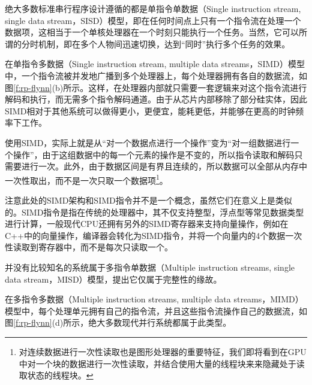 绝大多数标准串行程序设计遵循的都是单指令单数据（Single instruction stream, single data stream，SISD）模型，即在任何时间点上只有一个指令流在处理一个数据项，这相当于一个单核处理器在一个时刻只能执行一个任务。当然，它可以所谓的分时机制，即在多个人物间迅速切换，达到“同时”执行多个任务的效果。

在单指令多数据（Single instruction stream, multiple data streams，SIMD）模型中，一个指令流被并发地广播到多个处理器上，每个处理器拥有各自的数据流，如图\ref{f:rp-flynn}(b)所示。这样，在处理器内部就只需要一套逻辑来对这个指令流进行解码和执行，而无需多个指令解码通道。由于从芯片内部移除了部分硅实体，因此SIMD相对于其他系统可以做得更小，更便宜，能耗更低，并能够在更高的时钟频率下工作。

使用SIMD，实际上就是从“对一个数据点进行一个操作”变为“对一组数据进行一个操作”，由于这组数据中的每一个元素的操作是不变的，所以指令读取和解码只需要进行一次。此外，由于数据区间是有界且连续的，所以数据可以全部从内存中一次性取出，而不是一次只取一个数据项\footnote{对连续数据进行一次性读取也是图形处理器的重要特征，我们即将看到在GPU中对一个块的数据进行一次性读取，并结合使用大量的线程块来来隐藏处于读取状态的线程块。}。

\begin{shaded*}
	注意此处的SIMD架构和SIMD指令并不是一个概念，虽然它们在意义上是类似的。SIMD指令是指在传统的处理器中，其不仅支持整型，浮点型等常见数据类型进行计算，一般现代CPU还拥有另外的SIMD寄存器来支持向量操作，例如在C++中的向量操作，编译器会转化为SIMD指令，并将一个向量内的4个数据一次性读取到寄存器中，而不是每次只读取一个。
\end{shaded*}

并没有比较知名的系统属于多指令单数据（Multiple instruction streams, single data stream，MISD）模型，提出它仅属于完整性的缘故。

在多指令多数据（Multiple instruction streams, multiple data streams，MIMD）模型中，每个处理单元拥有自己的指令流，并且这些指令流操作自己的数据流，如图\ref{f:rp-flynn}(d)所示，绝大多数现代并行系统都属于此类型。








